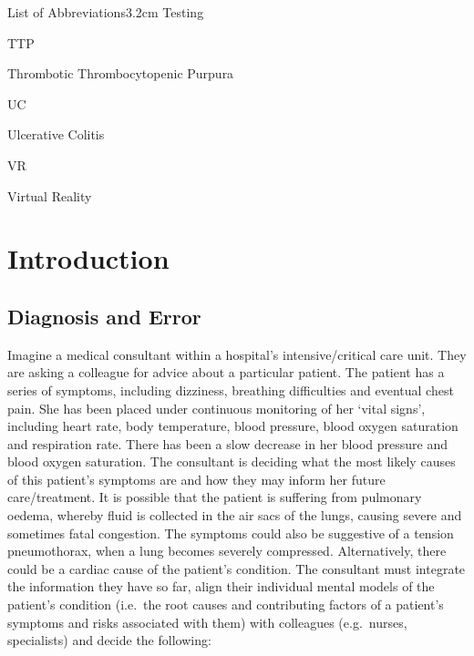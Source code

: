 \documentclass[a4paper, nobind]{templates/ociamthesis}
\begin{document}
\begin{romanpages}
\begin{mclistof}{List of Abbreviations}{3.2cm}
Testing

\item[TTP]

Thrombotic Thrombocytopenic Purpura

\item[UC]

Ulcerative Colitis

\item[VR]

Virtual Reality

\end{mclistof} 


\end{romanpages}

\flushbottom

\chapter{Introduction}\label{chapter-1}

\adjustmtc
{}

\section{Diagnosis and Error}\label{diagnosis-and-error}

Imagine a medical consultant within a hospital's intensive/critical care unit. They are asking a colleague for advice about a particular patient. The patient has a series of symptoms, including dizziness, breathing difficulties and eventual chest pain. She has been placed under continuous monitoring of her `vital signs', including heart rate, body temperature, blood pressure, blood oxygen saturation and respiration rate. There has been a slow decrease in her blood pressure and blood oxygen saturation. The consultant is deciding what the most likely causes of this patient's symptoms are and how they may inform her future care/treatment. It is possible that the patient is suffering from pulmonary oedema, whereby fluid is collected in the air sacs of the lungs, causing severe and sometimes fatal congestion. The symptoms could also be suggestive of a tension pneumothorax, when a lung becomes severely compressed. Alternatively, there could be a cardiac cause of the patient's condition. The consultant must integrate the information they have so far, align their individual mental models of the patient's condition (i.e.~the root causes and contributing factors of a patient's symptoms and risks associated with them) with colleagues (e.g.~nurses, specialists) and decide the following:
\end{document}
